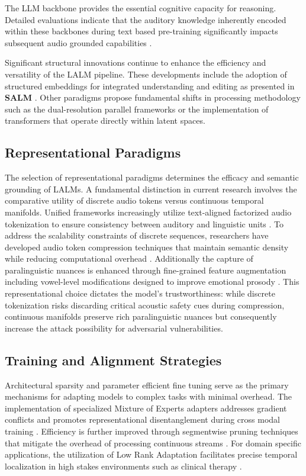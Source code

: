 The LLM backbone provides the essential cognitive capacity for reasoning. Detailed evaluations indicate that the auditory knowledge inherently encoded within these backbones during text based pre-training significantly impacts subsequent audio grounded capabilities \cite{lu2026how}.

Significant structural innovations continue to enhance the efficiency and versatility of the LALM pipeline. These developments include the adoption of structured embeddings for integrated understanding and editing as presented in \textbf{SALM} \cite{hu2025salm}. Other paradigms propose fundamental shifts in processing methodology such as the dual-resolution parallel frameworks or the implementation of transformers that operate directly within latent spaces\cite{lu2025latent}.

\subsection{Representational Paradigms}
The selection of representational paradigms determines the efficacy and semantic grounding of LALMs. A fundamental distinction in current research involves the comparative utility of discrete audio tokens versus continuous temporal manifolds. Unified frameworks increasingly utilize text-aligned factorized audio tokenization to ensure consistency between auditory and linguistic units \cite{yang2026uniaudio}. To address the scalability constraints of discrete sequences, researchers have developed audio token compression techniques that maintain semantic density while reducing computational overhead \cite{bhati2025towards}. Additionally the capture of paralinguistic nuances is enhanced through fine-grained feature augmentation including vowel-level modifications designed to improve emotional prosody \cite{wang2026vowelprompt}. This representational choice dictates the model's trustworthiness: while discrete tokenization risks discarding critical acoustic safety cues during compression, continuous manifolds preserve rich paralinguistic nuances but consequently increase the attack possibility for adversarial vulnerabilities.

\subsection{Training and Alignment Strategies}
Architectural sparsity and parameter efficient fine tuning serve as the primary mechanisms for adapting models to complex tasks with minimal overhead. The implementation of specialized Mixture of Experts adapters addresses gradient conflicts and promotes representational disentanglement during cross modal training \cite{lei2026moe}. Efficiency is further improved through segmentwise pruning techniques that mitigate the overhead of processing continuous streams \cite{gibier2025segmentwise}. For domain specific applications, the utilization of Low Rank Adaptation facilitates precise temporal localization in high stakes environments such as clinical therapy \cite{bn2025fine}.

